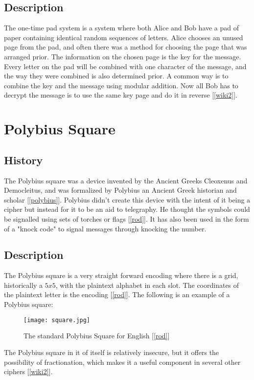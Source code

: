 \documentclass[12pt]{article}
\begin{document}
\subsection{Description}
The one-time pad system is a system where both Alice and Bob have a pad of paper containing identical random sequences of letters. Alice chooses an unused page from the pad, and often there was a method for choosing the page that was arranged prior. The information on the chosen page is the key for the message. Every letter on the pad will be combined with one character of the message, and the way they were combined is also determined prior. A common way is to combine the key and the message using modular addition. Now all Bob has to decrypt the message is to use the same key page and do it in reverse [\ref{wiki2}].

\section{Polybius Square}

\subsection{History}
The Polybius square was a device invented by the Ancient Greeks Cleoxenus and Democleitus, and was formalized by Polybius an Ancient Greek historian and scholar [\ref{polybius}].  Polybius didn't create this device with the intent of it being a cipher but instead for it to be an aid to telegraphy. He thought the symbols could be signalled using sets of torches or flags [\ref{rod}]. It has also been used in the form of a "knock code" to signal messages through knocking the number.
\subsection{Description}
The Polybius square is a very straight forward encoding where there is a grid, historically a $5x5$, with the plaintext alphabet in each slot. The coordinates of the plaintext letter is the encoding [\ref{rod}]. The following is an example of a Polybius square:\\
\begin{figure}[H]
        \texttt{[image: square.jpg]}
        \caption{The standard Polybius Square for English [\ref{rod}]}
        \label{fig:340}
    \end{figure}
The Polybius square in it of itself is relatively insecure, but it offers the possibility of fractionation, which makes it a useful component in several other ciphers [\ref{wiki2}]. 
\end{document}
